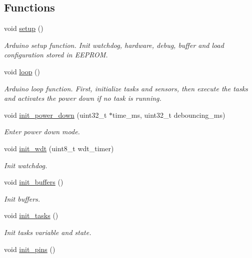 \subsection*{Functions}
\begin{DoxyCompactItemize}
\item 
void \hyperlink{i2c-rain_8ino_a4fc01d736fe50cf5b977f755b675f11d}{setup} ()
\begin{DoxyCompactList}\small\item\em Arduino setup function. Init watchdog, hardware, debug, buffer and load configuration stored in E\+E\+P\+R\+OM. \end{DoxyCompactList}\item 
void \hyperlink{i2c-rain_8ino_afe461d27b9c48d5921c00d521181f12f}{loop} ()
\begin{DoxyCompactList}\small\item\em Arduino loop function. First, initialize tasks and sensors, then execute the tasks and activates the power down if no task is running. \end{DoxyCompactList}\item 
void \hyperlink{i2c-rain_8ino_afb98a0f07c30784284f48271ffe02b97}{init\+\_\+power\+\_\+down} (uint32\+\_\+t $\ast$time\+\_\+ms, uint32\+\_\+t debouncing\+\_\+ms)
\begin{DoxyCompactList}\small\item\em Enter power down mode. \end{DoxyCompactList}\item 
void \hyperlink{i2c-rain_8ino_a980e73df66b14b1190bc25da430a4f12}{init\+\_\+wdt} (uint8\+\_\+t wdt\+\_\+timer)
\begin{DoxyCompactList}\small\item\em Init watchdog. \end{DoxyCompactList}\item 
void \hyperlink{i2c-rain_8ino_ad241cc00b1a92e6d85827df96778e442}{init\+\_\+buffers} ()
\begin{DoxyCompactList}\small\item\em Init buffers. \end{DoxyCompactList}\item 
void \hyperlink{i2c-rain_8ino_ab4bf0a3d77da083f131d3fa35a37d2b1}{init\+\_\+tasks} ()
\begin{DoxyCompactList}\small\item\em Init tasks variable and state. \end{DoxyCompactList}\item 
void \hyperlink{i2c-rain_8ino_ad8b80a0c08f928106018edd6ea435b95}{init\+\_\+pins} ()

\end{DoxyCompactItemize}
